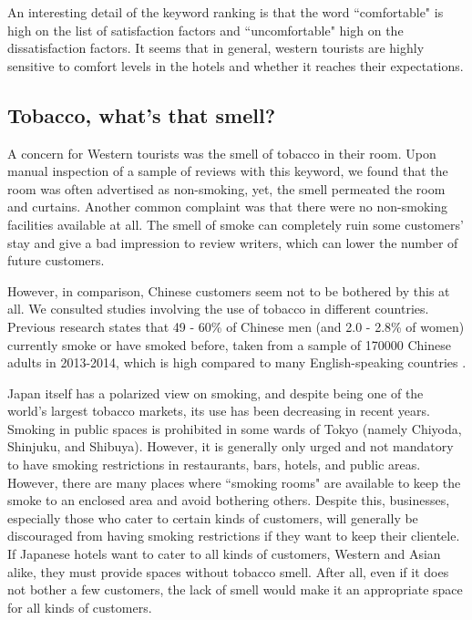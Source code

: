 \documentclass[smallextended,natbib]{svjour3}       %
\begin{document}
An interesting detail of the keyword ranking is that the word ``comfortable" is high on the list of satisfaction factors and ``uncomfortable" high on the dissatisfaction factors. It seems that in general, western tourists are highly sensitive to comfort levels in the hotels and whether it reaches their expectations.


\subsection{Tobacco, what's that smell?}\label{disc:tobacco}

A concern for Western tourists was the smell of tobacco in their room. Upon manual inspection of a sample of reviews with this keyword, we found that the room was often advertised as non-smoking, yet, the smell permeated the room and curtains. Another common complaint was that there were no non-smoking facilities available at all. The smell of smoke can completely ruin some customers' stay and give a bad impression to review writers, which can lower the number of future customers. 

However, in comparison, Chinese customers seem not to be bothered by this at all. We consulted studies involving the use of tobacco in different countries. Previous research states that 49 - 60\% of Chinese men (and 2.0 - 2.8\% of women) currently smoke or have smoked before, taken from a sample of \num[group-separator={,}]{170000} Chinese adults in 2013-2014, which is high compared to many English-speaking countries \cite[][]{zhang2019tobacco, who2015tobacco}.

Japan itself has a polarized view on smoking, and despite being one of the world's largest tobacco markets, its use has been decreasing in recent years. Smoking in public spaces is prohibited in some wards of Tokyo (namely Chiyoda, Shinjuku, and Shibuya). However, it is generally only urged and not mandatory to have smoking restrictions in restaurants, bars, hotels, and public areas. However, there are many places where ``smoking rooms" are available to keep the smoke to an enclosed area and avoid bothering others. Despite this, businesses, especially those who cater to certain kinds of customers, will generally be discouraged from having smoking restrictions if they want to keep their clientele. If Japanese hotels want to cater to all kinds of customers, Western and Asian alike, they must provide spaces without tobacco smell. After all, even if it does not bother a few customers, the lack of smell would make it an appropriate space for all kinds of customers. 
\end{document}
